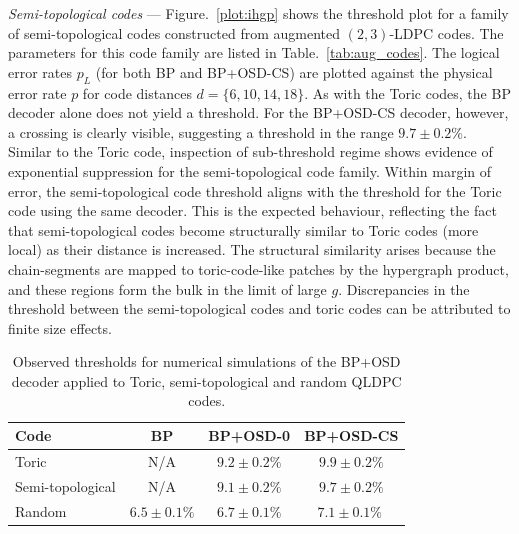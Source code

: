 \documentclass[%
 reprint,
superscriptaddress,
nofootinbib,
 amsmath,amssymb,
secnumarabic
]{revtex4-1}
\begin{document}
\textit{Semi-topological codes} --- Figure.~\ref{plot:ihgp} shows the threshold plot for a family of semi-topological codes constructed from augmented $(2,3)$-LDPC codes. The parameters for this code family are listed in Table.~\ref{tab:aug_codes}. The logical error rates $p_L$ (for both BP and BP+OSD-CS) are plotted against the physical error rate $p$ for code distances $d=\{6,10,14,18\}$. As with the Toric codes, the BP decoder alone does not yield a threshold. For the BP+OSD-CS decoder, however, a crossing is clearly visible, suggesting a threshold in the range $9.7\pm0.2\%$. Similar to the Toric code, inspection of sub-threshold regime shows evidence of exponential suppression for the semi-topological code family. Within margin of error, the semi-topological code threshold aligns with the threshold for the Toric code using the same decoder. This is the expected behaviour, reflecting the fact that semi-topological codes become structurally similar to Toric codes (more local) as their distance is increased. The structural similarity arises because the chain-segments are mapped to toric-code-like patches by the hypergraph product, and these regions form the bulk in the limit of large $g$. Discrepancies in the threshold between the semi-topological codes and toric codes can be attributed to finite size effects.


\begin{table}[]
	\renewcommand{\arraystretch}{1.4}
	\begin{tabular}{l|c|c|c}
		Code             & BP      & BP+OSD-0 & BP+OSD-CS \\ \hline
		Toric            & N/A     & $9.2\pm0.2\%$  & $9.9\pm0.2\%$          \\
		Semi-topological & N/A     & $9.1\pm0.2\%$  & $9.7\pm0.2\%     $     \\
		Random            & $6.5\pm0.1\%$ & $6.7\pm0.1\%$  & $7.1\pm0.1 \% \ $         
	\end{tabular}
	
	\caption{Observed thresholds for numerical simulations of the BP+OSD decoder applied to Toric, semi-topological and random QLDPC codes.}
	\label{TableThresholds}
\end{table}
\end{document}
